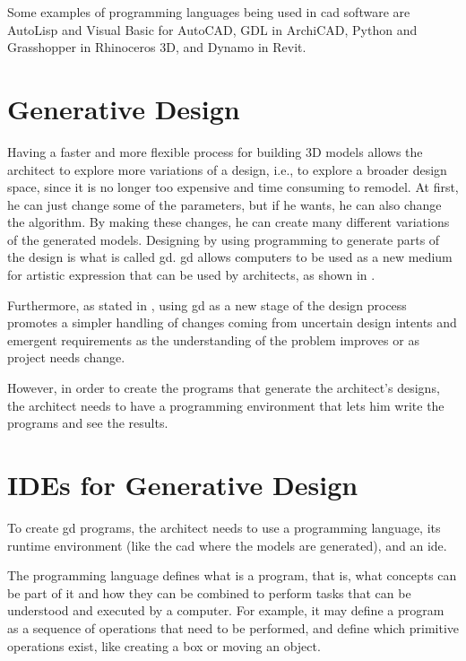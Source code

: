 Some examples of programming languages being used in \gls{cad} software are AutoLisp and Visual Basic for AutoCAD, GDL in ArchiCAD, Python and Grasshopper in Rhinoceros 3D, and Dynamo in Revit.


\section{Generative Design}
Having a faster and more flexible process for building 3D models allows the architect to explore more variations of a design, i.e., to explore a broader design space, since it is no longer too expensive and time consuming to remodel.
At first, he can just change some of the parameters, but if he wants, he can also change the algorithm.
By making these changes, he can create many different variations of the generated models.
Designing by using programming to generate parts of the design is what is called \gls{gd}.
\gls{gd} allows computers to be used as a new medium for artistic expression\cite{Maeda:2001:DN:559503} that can be used by architects, as shown in \cite{terzidis2003expressive}.

Furthermore, as stated in \cite{leitao2014pushing}, using \gls{gd} as a new stage of the design process promotes a simpler handling of changes coming from uncertain design intents and emergent requirements as the understanding of the problem improves or as project needs change.


However, in order to create the programs that generate the architect's designs, the architect needs to have a programming environment that lets him write the programs and see the results.


\section{IDEs for Generative Design}
To create \gls{gd} programs, the architect needs to use a programming language, its runtime environment (like the \gls{cad} where the models are generated), and an \gls{ide}.

The programming language defines what is a program, that is, what concepts can be part of it and how they can be combined to perform tasks that can be understood and executed by a computer.
For example, it may define a program as a sequence of operations that need to be performed, and define which primitive operations exist, like creating a box or moving an object.

